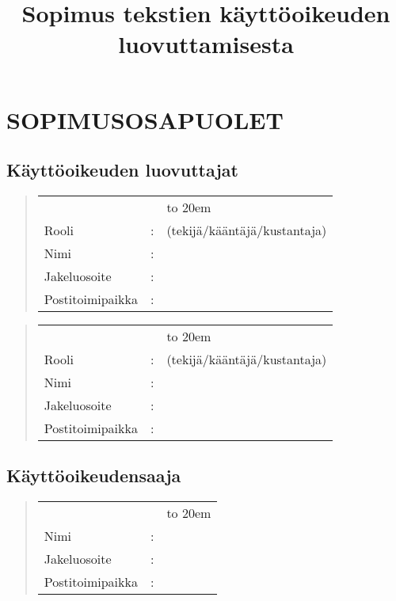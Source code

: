 \documentclass[a4paper,finnish]{article}
\begin{document}
\title{Sopimus tekstien käyttöoikeuden luovuttamisesta} 

\author{}
\date{}
\maketitle

\section{SOPIMUSOSAPUOLET}

\subsection{Käyttöoikeuden luovuttajat}

\begin{quote}
  \def\arraystretch{1.2}
  \begin{tabular}{lcl}
    &&\hbox to 20em{}\\
    Rooli&:& (tekijä/kääntäjä/kustantaja)\\
    Nimi&:&\\
    \cline{3-3}
    Jakeluosoite&:&\\
    \cline{3-3}
    Postitoimipaikka&:&\\
    \cline{3-3}
  \end{tabular}
\end{quote}

\begin{quote}
  \def\arraystretch{1.2}
  \begin{tabular}{lcl}
    &&\hbox to 20em{}\\
    Rooli&:& (tekijä/kääntäjä/kustantaja)\\
    Nimi&:&\\
    \cline{3-3}
    Jakeluosoite&:&\\
    \cline{3-3}
    Postitoimipaikka&:&\\
    \cline{3-3}
  \end{tabular}
\end{quote}

\subsection{Käyttöoikeudensaaja}
\begin{quote}
  \def\arraystretch{1.2}
\begin{tabular}{lcl}
    &&\hbox to 20em{}\\
    Nimi&:&\\
    \cline{3-3}
    Jakeluosoite&:&\\
    \cline{3-3}
    Postitoimipaikka&:&\\
    \cline{3-3}
\end{tabular}
\end{quote}
\end{document}
